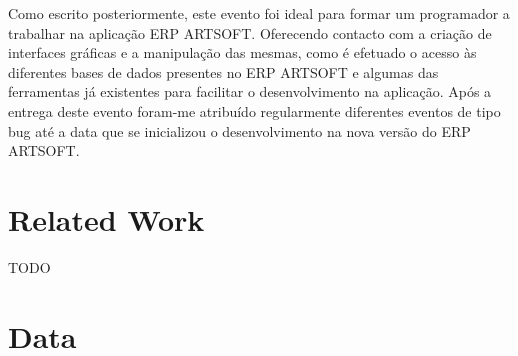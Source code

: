 \documentclass[sigplan]{acmart}
\begin{document}
\FloatBarrier
Como escrito posteriormente, este evento foi ideal para formar um programador a trabalhar na aplicação ERP ARTSOFT. Oferecendo contacto com a criação de interfaces gráficas e a manipulação das mesmas, como é efetuado o acesso às diferentes bases de dados presentes no ERP ARTSOFT e algumas das ferramentas já existentes para facilitar o desenvolvimento na aplicação. Após a entrega deste evento foram-me atribuído regularmente diferentes eventos de tipo bug até a data que se inicializou o desenvolvimento na nova versão do ERP ARTSOFT.

\section{Related Work} \label{sec:relatedwork}

TODO





\section{Data} \label{sec:data}
\end{document}
